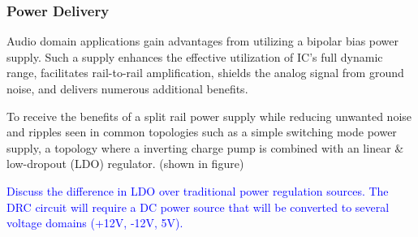 \documentclass[10pt]{article}
\begin{document}
\begin{multicols*}{2}
                \subsubsection{Power Delivery}
                    Audio domain applications gain advantages from utilizing a bipolar bias power supply. Such a supply enhances the effective utilization of IC's full dynamic range, facilitates rail-to-rail amplification, shields the analog signal from ground noise, and delivers numerous additional benefits. \cite{ti-3-v-rails}\par
                    To receive the benefits of a split rail power supply while reducing unwanted noise and ripples seen in common topologies such as a simple switching mode power supply, a topology where a inverting charge pump is combined with an linear \& low-dropout (LDO) regulator. (shown in figure)\par
                    \textcolor{blue}{Discuss the difference in LDO over traditional power regulation sources. The DRC circuit will require a DC power source that will be converted to several voltage domains (+12V, -12V, 5V).}
                    
                    \noindent
                    \begin{minipage}{\linewidth}

                        \centering

\end{minipage}
\end{multicols*}
\end{document}
